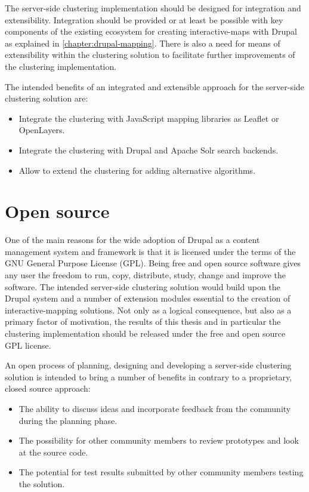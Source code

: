 The server-side clustering implementation should be designed for integration and extensibility. Integration should be provided or at least be possible with key components of the existing ecosystem for creating interactive-maps with Drupal as explained in \ref{chapter:drupal-mapping}. There is also a need for means of extensibility within the clustering solution to facilitate further improvements of the clustering implementation.

The intended benefits of an integrated and extensible approach for the server-side clustering solution are:

\begin{itemize}

\item Integrate the clustering with JavaScript mapping libraries as Leaflet or OpenLayers.

\item Integrate the clustering with Drupal and Apache Solr search backends.

\item Allow to extend the clustering for adding alternative algorithms. 

\end{itemize}


\section{Open source}
\label{chapter:open-source}

One of the main reasons for the wide adoption of Drupal as a content management system and framework is that it is licensed under the terms of the GNU General Purpose License (GPL). Being free and open source software gives any user the freedom to run, copy, distribute, study, change and improve the software. The intended server-side clustering solution would build upon the Drupal system and a number of extension modules essential to the creation of interactive-mapping solutions. Not only as a logical consequence, but also as a primary factor of motivation, the results of this thesis and in particular the clustering implementation should be released under the free and open source GPL license.

An open process of planning, designing and developing a server-side clustering solution is intended to bring a number of benefits in contrary to a proprietary, closed source approach:

\begin{itemize}

\item The ability to discuss ideas and incorporate feedback from the community during the planning phase.

\item The possibility for other community members to review prototypes and look at the source code.

\item The potential for test results submitted by other community members testing the solution. 

\end{itemize}


